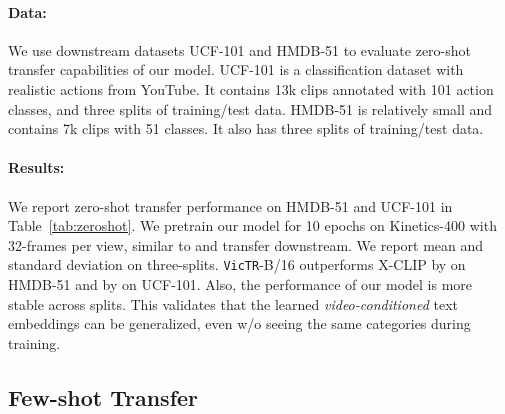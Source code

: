 \documentclass[10pt,twocolumn,letterpaper]{article}
\newcommand{\tref}[1]{Table~\ref{#1}}
\newcommand{\ours}{\texttt{VicTR}}
\begin{document}
\paragraph{Data:} We use downstream datasets UCF-101 \cite{soomro2012ucf101} and HMDB-51 \cite{kuehne2011hmdb} to evaluate zero-shot transfer capabilities of our model. UCF-101 is a classification dataset with realistic actions from YouTube. It contains 13k clips annotated with 101 action classes, and three splits of training/test data. HMDB-51 is relatively small and contains 7k clips with 51 classes. It also has three splits of training/test data.

\paragraph{Results:} We report zero-shot transfer performance on HMDB-51 \cite{kuehne2011hmdb} and UCF-101 \cite{soomro2012ucf101} in \tref{tab:zeroshot}. We pretrain our model for 10 epochs on Kinetics-400 \cite{kay2017kinetics} with 32-frames per view, similar to  \cite{ma2022xclip} and transfer downstream. We report mean and standard deviation on three-splits. \ours-B/16 outperforms X-CLIP \cite{ma2022xclip} by  on HMDB-51 and by  on UCF-101. Also, the performance of our model is more stable across splits. This validates that the learned \textit{video-conditioned} text embeddings can be generalized, even w/o seeing the same categories during training.

\subsection{Few-shot Transfer}
\end{document}
